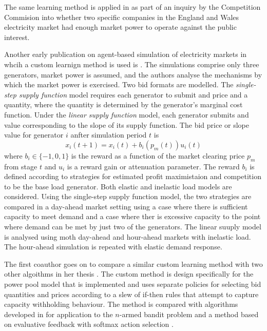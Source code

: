 The same learning method is applied in \cite{bunn:03} as part of an
inquiry by the Competition Commision into whether two specific companies in the
England and Wales electricity market had enough market power to operate against
the public interest.

Another early publication on agent-based simulation of electricity markets in
whcih a custom learnign method is used is \cite{visud:99}.  The simulations
comprise only three generators, market power is assumed, and the authors
analyse the mechanisms by which the market power is exercised.  Two bid formats
are modelled.  The \textit{single-step supply function} model requires each
generator to submit and price and a quantity, where the quantity is determined
by the generator's marginal cost function.  Under the \textit{linear supply
function} model, each generator submits and value corresponding to the slope of
its supply function.  The bid price or slope value for generator $i$ anfter
simulation period $t$ is
\begin{equation}
x_i(t+1) = x_i(t) + b_i(p_m(t))u_i(t)
\end{equation}
where $b_i \in \lbrace-1,0,1\rbrace$ is the reward as a function of the market
clearing price $p_m$ from stage $t$ and $u_i$ is a reward gain or attenuation
parameter.  The reward $b_i$ is defined according to strategies for estimated
profit maximistaion and competition to be the base load generator.  Both
elastic and inelastic load models are considered.  Using the single-step supply
function model, the two strategies are compared in a day-ahead market setting
using a case where there is sufficient capacity to meet demand and a case where
ther is excessive capacity to the point where demand can be met by just two of
the generators.  The linear suuply model is analysed using moth day-ahead and
hour-ahead markets with inelastic load.  The hour-ahead simulation is repeated
with elastic demand response.

The first coauthor goes on to compare a similar custom learning method with two
other algoithms in her thesis \cite{visud:thesis}.  The custom method is design
specifically for the power pool model that is implemented and uses separate
policies for selecting bid quantities and prices according to a slew of if-then
rules that attempt to capture capacity withholding behaviour.  The method is
compared with algorithms developed in \cite{auer:03} for application to the
$n$-armed bandit problem \cite[\S2.1]{robbins:53,suttonbarto:1998} and a method
based on evaluative feedback with softmax action selection
\cite[\S2]{suttonbarto:1998}.

